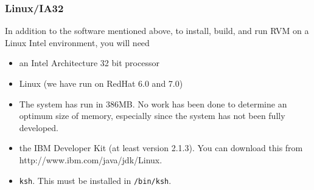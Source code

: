 \subsubsection{Linux/IA32}
In addition to the software mentioned above, to install, build, and
run RVM on a Linux Intel environment, you will need 
\begin{itemize}
\item an Intel Architecture 32 bit processor
\item Linux  (we have run on RedHat 6.0 and 7.0)
\item The system has run in 386MB. No work has been done to determine 
an optimum size of memory, especially since the system has not been fully developed.
\item the IBM Developer Kit (at least version 2.1.3).  You can download this from
           {http://www.ibm.com/java/jdk/Linux}.
\item {\tt ksh}. This must be installed in {\tt /bin/ksh}.
\end{itemize}


